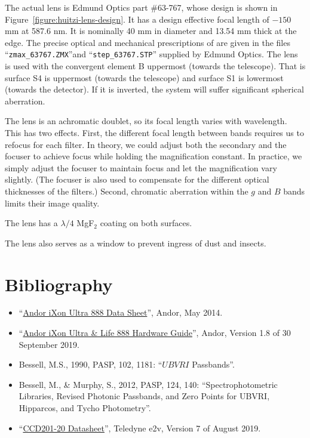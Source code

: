 The actual lens is Edmund Optics part \#63-767, whose design is shown in Figure~\ref{figure:huitzi-lens-design}. It has a design effective focal length of $-150$ mm at 587.6 nm. It is nominally 40 mm in diameter and 13.54 mm thick at the edge. The precise optical and mechanical prescriptions of are given in the files “\verb|zmax_63767.ZMX|”and “\verb|step_63767.STP|” supplied by Edmund Optics. The lens is used with the convergent element B uppermost (towards the telescope). That is surface S4 is uppermost (towards the telescope) and surface S1 is lowermost (towards the detector). If it is inverted, the system will suffer significant spherical aberration.

The lens is an achromatic doublet, so its focal length varies with wavelength. This has two effects. First, the different focal length between bands requires us to refocus for each filter. In theory, we could adjust both the secondary and the focuser to achieve focus while holding the magnification constant. In practice, we simply adjust the focuser to maintain focus and let the magnification vary slightly. (The focuser is also used to compensate for the different optical thicknesses of the filters.) Second, chromatic aberration within the $g$ and $B$ bands limits their image quality.

The lens has a $\lambda/4$ MgF$_2$ coating on both surfaces.

The lens also serves as a window to prevent ingress of dust and insects.

\section{Bibliography}

\begin{flushleft}
\begin{itemize}
\item “\href{bibliography/huitzi/andor-ixon-ultra-888-data-sheet.pdf}{Andor iXon Ultra 888 Data Sheet}”, Andor, May 2014.
\item “\href{bibliography/huitzi/andor-ixon-ultra-888-hardware-guide.pdf}{Andor iXon Ultra \& Life 888 Hardware Guide}”, Andor, Version 1.8 of 30 September 2019.
\item Bessell, M.S., 1990, PASP, 102, 1181: “$UBVRI$ Passbands”.
\item Bessell, M., \& Murphy, S., 2012,  PASP, 124, 140: “Spectrophotometric Libraries, Revised Photonic Passbands, and Zero Points for UBVRI, Hipparcos, and Tycho Photometry”.
\item “\href{bibliography/huitzi/e2v-ccd201-20-datasheet.pdf}{CCD201-20 Datasheet}”, Teledyne e2v, Version 7 of August 2019.
\end{itemize}
\end{flushleft}



